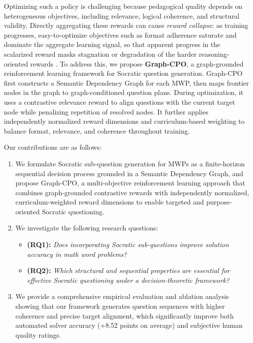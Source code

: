\documentclass[sigconf, anonymous, review, screen]{acmart}
\begin{document}
Optimizing such a policy is challenging because pedagogical quality depends on heterogeneous objectives, including relevance, logical coherence, and structural validity. Directly aggregating these rewards can cause \emph{reward collapse}: as training progresses, easy-to-optimize objectives such as format adherence saturate and dominate the aggregate learning signal, so that apparent progress in the scalarized reward masks stagnation or degradation of the harder reasoning-oriented rewards \cite{shao2024deepseekmath, liu2026gdpo}. To address this, we propose \textbf{Graph-CPO}, a graph-grounded reinforcement learning framework for Socratic question generation. Graph-CPO first constructs a Semantic Dependency Graph for each MWP, then maps frontier nodes in the graph to graph-conditioned question plans. During optimization, it uses a contrastive relevance reward to align questions with the current target node while penalizing repetition of resolved nodes. It further applies independently normalized reward dimensions and curriculum-based weighting to balance format, relevance, and coherence throughout training.

Our contributions are as follows:
\begin{enumerate}
    \item We formulate Socratic sub-question generation for MWPs as a finite-horizon sequential decision process grounded in a Semantic Dependency Graph, and propose Graph-CPO, a multi-objective reinforcement learning approach that combines graph-grounded contrastive rewards with independently normalized, curriculum-weighted reward dimensions to enable targeted and purpose-oriented Socratic questioning.

    \item We investigate the following research questions:
        \begin{itemize}
          \item \textbf{(RQ1):} \textit{Does incorporating Socratic sub-questions improve solution accuracy in math word problems?}
          \item \textbf{(RQ2):} \textit{Which structural and sequential properties are essential for effective Socratic questioning under a decision-theoretic framework?}
        \end{itemize}

    \item We provide a comprehensive empirical evaluation and ablation analysis showing that our framework generates question sequences with higher coherence and precise target alignment, which significantly improve both automated solver accuracy (+8.52 points on average) and subjective human quality ratings.

\end{enumerate}
\end{document}
